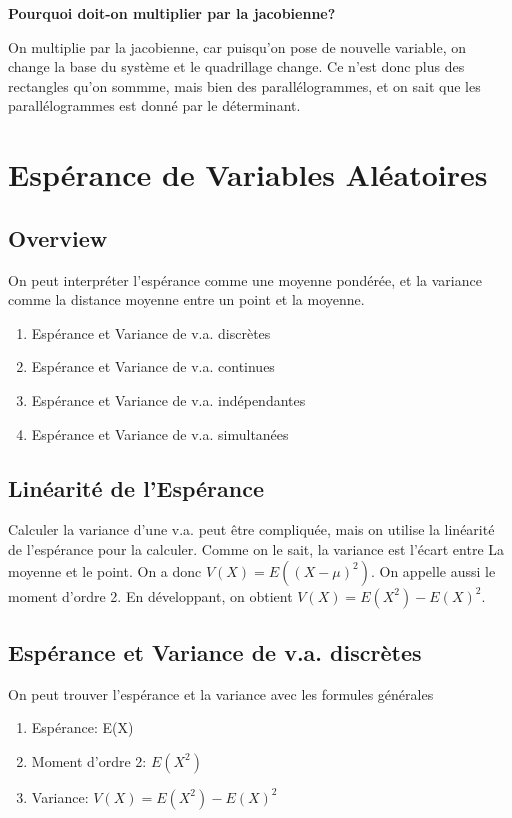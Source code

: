 \documentclass{article}
\begin{document}
\textbf{Pourquoi doit-on multiplier par la jacobienne?}

On multiplie par la jacobienne, car puisqu'on pose de nouvelle variable,
on change la base du système et le quadrillage change. Ce n'est donc
plus des rectangles qu'on sommme, mais bien des parallélogrammes, et
on sait que les parallélogrammes est donné par le déterminant.

\section{Espérance de Variables Aléatoires}
\subsection*{Overview}

On peut interpréter l'espérance comme une moyenne pondérée, et la variance
comme la distance moyenne entre un point et la moyenne.

\begin{enumerate}
    \item Espérance et Variance de v.a. discrètes
    \item Espérance et Variance de v.a. continues
    \item Espérance et Variance de v.a. indépendantes
    \item Espérance et Variance de v.a. simultanées
\end{enumerate}

\subsection{Linéarité de l'Espérance}%
\label{sub:Linéarité de l'Espérance}

Calculer la variance d'une v.a. peut être compliquée, mais on utilise
la linéarité de l'espérance pour la calculer. Comme on le sait, la
variance est l'écart entre La moyenne et le point. On a donc
$ V(X) = E((X - \mu)^2) $. On appelle aussi le moment d'ordre 2. En
développant, on obtient $ V(X) = E(X^2) - E(X)^2 $.

\subsection{Espérance et Variance de v.a. discrètes}

On peut trouver l'espérance et la variance avec les formules générales
\begin{enumerate}
    \item Espérance: E(X)
    \item Moment d'ordre 2: $E(X^2)$
    \item Variance: $V(X) = E(X^2) - E(X)^2 $
\end{enumerate}
\end{document}
